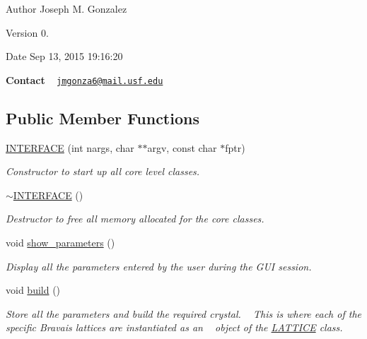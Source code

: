 \begin{DoxyAuthor}{Author}
Joseph M. Gonzalez
\end{DoxyAuthor}
\begin{DoxyVersion}{Version}
0.
\end{DoxyVersion}
\begin{DoxyDate}{Date}
Sep 13, 2015 19\+:16\+:20
\end{DoxyDate}
{\bfseries Contact} ~\newline
 \href{mailto:jmgonza6@mail.usf.edu}{\tt jmgonza6@mail.\+usf.\+edu} \subsection*{Public Member Functions}
\begin{DoxyCompactItemize}
\item 
\hyperlink{class_i_n_t_e_r_f_a_c_e_a62b3960b528d5220fe0a52e87382cc6e}{I\+N\+T\+E\+R\+F\+A\+C\+E} (int nargs, char $\ast$$\ast$argv, const char $\ast$fptr)
\begin{DoxyCompactList}\small\item\em Constructor to start up all core level classes. \end{DoxyCompactList}\item 
\hyperlink{class_i_n_t_e_r_f_a_c_e_aad406ae7418ff69f2c3131c67db2c736}{$\sim$\+I\+N\+T\+E\+R\+F\+A\+C\+E} ()
\begin{DoxyCompactList}\small\item\em Destructor to free all memory allocated for the core classes. \end{DoxyCompactList}\item 
void \hyperlink{class_i_n_t_e_r_f_a_c_e_a17e7bd199040a2aaf2b1d7d138e53759}{show\+\_\+parameters} ()
\begin{DoxyCompactList}\small\item\em Display all the parameters entered by the user during the G\+U\+I session. \end{DoxyCompactList}\item 
void \hyperlink{class_i_n_t_e_r_f_a_c_e_a71c1db660fb6a11b08b9144c999cb0ed}{build} ()
\begin{DoxyCompactList}\small\item\em Store all the parameters and build the required crystal. ~\newline
This is where each of the specific Bravais lattices are instantiated as an ~\newline
object of the \hyperlink{class_l_a_t_t_i_c_e}{L\+A\+T\+T\+I\+C\+E} class. \end{DoxyCompactList}\item 
$$
\end{DoxyCompactItemize}
